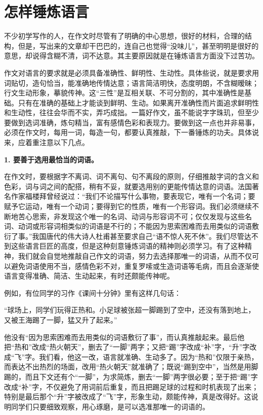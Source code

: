 \section{怎样锤炼语言}

不少初学写作的人，在作文时尽管有了明确的中心思想，很好的材料，合理的结构，但是，写出来的文章却干巴巴的，连自己也觉得“没味儿”，甚至明明是很好的意思，却说得含糊不清，词不达意。其主要原因就是在锤炼语言方面没下过苦功。

作文对语言的要求就是必须具备准确性、鲜明性、生动性。具体些说，就是要求用词贴切，造句恰当，能准确地传情达意；语言简洁明快，态度明朗，不含糊暧昧；行文生动形象，摹貌传神。这“三性”是互相关联、不可分割的，其中准确性是基础。只有在准确的基础上才能谈到鲜明、生动。如果离开准确性而片面追求鲜明性和生动性，往往会华而不实，弄巧成拙。一篇好作文，虽不能说字字珠玑，但至少要做到选词准确，炼句精当，富有感情色彩和表现力。要做到这一点也并非易事，必须在作文时，每用一词，每造一句，都要认真推敲，下一番锤炼的功夫。具体说来，应着重注意以下几点。

\textbf{1. 要善于选用最恰当的词语。}

在作文时，要根据字不离词、词不离句、句不离段的原则，仔细推敲字词的含义和色彩，词与词之间的配搭，稍有不妥，就要选用别的更能传情达意的词语。法国著名作家福楼拜曾经说过：“我们不论描写什么事物，要表现它，唯有一个名词；要赋予它运动，唯有一个动词；要得到它的性质，唯有一个形容词。我们必须继续不断地苦心思索，非发现这个唯一的名词、动词与形容词不可；仅仅发现与这些名词、动词或形容词相类似的词语是不行的；不能因为思索困难而去用类似的词语敷衍了事。”我国唐代的伟大诗人杜甫甚至要求自己“语不惊人死不休”。我们尽管达不到这些语言巨匠的高度，但是这种刻意锤炼词语的精神则必须学习。有了这种精神，我们就会自觉地推敲自己作文的词语，努力去选择那唯一的词语，从而不仅可以避免词语使用不当，感情色彩不对，重复罗嗦或生造词语等毛病，而且会逐渐使语言变得准确、简洁、生动起来，有时还颇能传神呢。

例如，有位同学的习作《课间十分钟》里有这样几句话：

“球场上，同学们玩得正热和。小足球被张超一脚踢到了空中，还没有落到地上，又被王海踢了一脚，猛又升了起来。”

他没有“因为思索困难而去用类似的词语敷衍了事”，而认真推敲起来。最后他把“热和”改成“热火朝天”，删去了“一脚”两字；又把“踢”字改成“补”字，“升”字改成“飞”字。我们看，他这一改，语言就准确、生动多了。因为“热和”仅限于亲热，而表达不出热烈的场面，改用“热火朝天”就准确了；既说“踢到空中”，当然是用脚踢的，而且下文还有个“一脚”，为求简炼，删去“一脚”两字很必要；至于把“踢”字改成“补”字，不仅避免了用词前后重复，而且把踢足球的过程和时机表现了出来；特别是最后那个“升”字被改成了“飞”字，形象生动，颇能传神，真是改得好。这说明同学们只要细致观察，用心琢磨，是可以选准那唯一的词语的。

